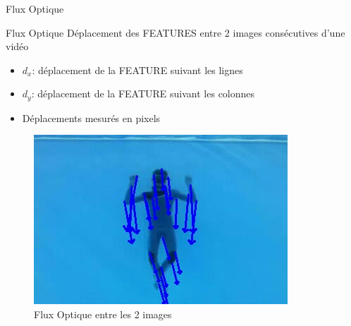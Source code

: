 \documentclass{bredelebeamer}
\begin{document}
\begin{frame}{Flux Optique}

\begin{alertblock}{Flux Optique}
Déplacement des FEATURES entre 2 images consécutives d'une vidéo
\begin{itemize}
	\item $d_{x}$: déplacement de la FEATURE suivant les lignes
	\item $d_{y}$: déplacement de la FEATURE suivant les colonnes
	\item Déplacements mesurés en pixels
\end{itemize}
\end{alertblock}

\begin{figure}
\centering
\includegraphics[scale=0.4]{images/plongeurOpticalFlow.jpeg}
\caption{Flux Optique entre les 2 images}
\end{figure}

\end{frame}

\end{document}
